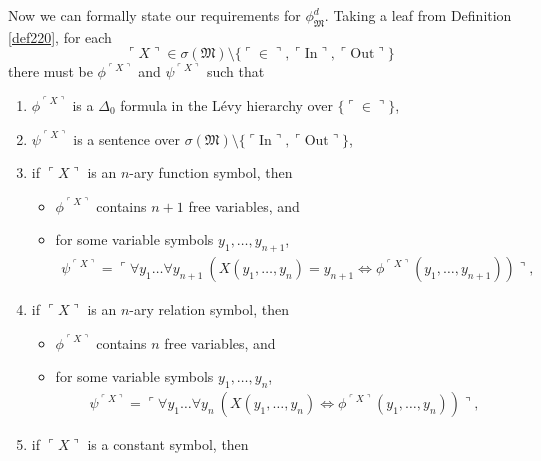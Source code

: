 \documentclass[12pt, twoside]{memoir}
\numberwithin{equation}{section}
\theoremstyle{definition}
\theoremstyle{remark}
\theoremstyle{definition}
\theoremstyle{definition}
\theoremstyle{definition}
\theoremstyle{remark}
\begin{document}
Now we can formally state our requirements for $\phi^d_{\mathfrak{M}}$. Taking a leaf from Definition \ref{def220}, for each 
\begin{equation*}
    \ulcorner X \urcorner \in \sigma(\mathfrak{M}) \setminus \{\ulcorner \in \urcorner, \ulcorner \mathrm{In} \urcorner, \ulcorner \mathrm{Out} \urcorner\}
\end{equation*} there must be $\phi^{\ulcorner X \urcorner}$ and $\psi^{\ulcorner X \urcorner}$ such that
\begin{enumerate}[label=(\alph*)]
    \item\label{simpa} $\phi^{\ulcorner X \urcorner}$ is a $\Delta_0$ formula in the L\'{e}vy hierarchy over $\{\ulcorner \in \urcorner\}$,
    \item $\psi^{\ulcorner X \urcorner}$ is a sentence over $\sigma(\mathfrak{M}) \setminus \{\ulcorner \mathrm{In} \urcorner, \ulcorner \mathrm{Out} \urcorner\}$,
    \item if $\ulcorner X \urcorner$ is an $n$-ary function symbol, then 
    \begin{itemize}[label=$\circ$, leftmargin=20pt]
        \item $\phi^{\ulcorner X \urcorner}$ contains $n + 1$ free variables, and
        \item for some variable symbols $y_1, \dots, y_{n+1}$,
        \begin{align*}
            \psi^{\ulcorner X \urcorner} = \ulcorner \forall y_1 \dots \forall y_{n+1} \ (X(y_1, \dots, y_n) = y_{n+1} \iff \phi^{\ulcorner X \urcorner}(y_1, \dots, y_{n+1})) \urcorner \text{,}
        \end{align*}
    \end{itemize}
    \item if $\ulcorner X \urcorner$ is an $n$-ary relation symbol, then 
    \begin{itemize}[label=$\circ$, leftmargin=20pt]
        \item $\phi^{\ulcorner X \urcorner}$ contains $n$ free variables, and
        \item for some variable symbols $y_1, \dots, y_n$,
        \begin{align*}
            \psi^{\ulcorner X \urcorner} = \ulcorner \forall y_1 \dots \forall y_n \ (X(y_1, \dots, y_n) \iff \phi^{\ulcorner X \urcorner}(y_1, \dots, y_n)) \urcorner \text{,}
        \end{align*}
    \end{itemize}
    \item if $\ulcorner X \urcorner$ is a constant symbol, then 

\end{enumerate}
\end{document}
